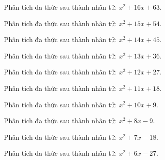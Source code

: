 \begin{bt}
	Phân tích đa thức sau thành nhân tử: $x^2 + 16 x + 63$.
\end{bt}
\begin{bt}
	Phân tích đa thức sau thành nhân tử: $x^2 + 15 x + 54$.
\end{bt}
\begin{bt}
	Phân tích đa thức sau thành nhân tử: $x^2 + 14 x + 45$.
\end{bt}
\begin{bt}
	Phân tích đa thức sau thành nhân tử: $x^2 + 13 x + 36$.
\end{bt}
\begin{bt}
	Phân tích đa thức sau thành nhân tử: $x^2 + 12 x + 27$.
\end{bt}
\begin{bt}
	Phân tích đa thức sau thành nhân tử: $x^2 + 11 x + 18$.
\end{bt}
\begin{bt}
	Phân tích đa thức sau thành nhân tử: $x^2 + 10 x + 9$.
\end{bt}
\begin{bt}
	Phân tích đa thức sau thành nhân tử: $x^2 + 8 x - 9$.
\end{bt}
\begin{bt}
	Phân tích đa thức sau thành nhân tử: $x^2 + 7 x - 18$.
\end{bt}
\begin{bt}
	Phân tích đa thức sau thành nhân tử: $x^2 + 6 x - 27$.
\end{bt}

